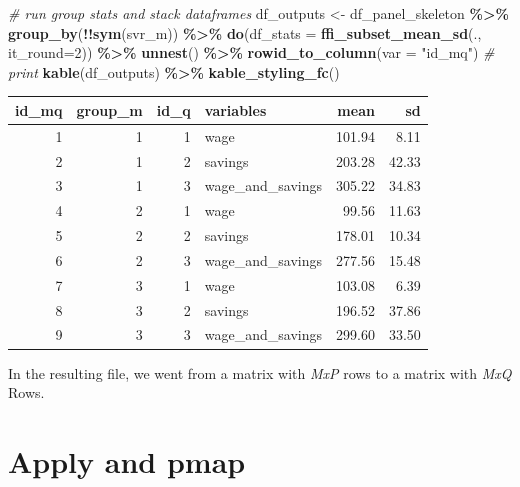 \documentclass[
]{book}
\newenvironment{Shaded}{\begin{snugshade}}{\end{snugshade}}
\newcommand{\CommentTok}[1]{\textcolor[rgb]{0.56,0.35,0.01}{\textit{#1}}}
\newcommand{\DataTypeTok}[1]{\textcolor[rgb]{0.13,0.29,0.53}{#1}}
\newcommand{\DecValTok}[1]{\textcolor[rgb]{0.00,0.00,0.81}{#1}}
\newcommand{\KeywordTok}[1]{\textcolor[rgb]{0.13,0.29,0.53}{\textbf{#1}}}
\newcommand{\NormalTok}[1]{#1}
\newcommand{\OperatorTok}[1]{\textcolor[rgb]{0.81,0.36,0.00}{\textbf{#1}}}
\newcommand{\StringTok}[1]{\textcolor[rgb]{0.31,0.60,0.02}{#1}}
\begin{document}
\begin{Shaded}
\begin{Highlighting}[]
\CommentTok{\# run group stats and stack dataframes}
\NormalTok{df\_outputs \textless{}{-}}\StringTok{ }\NormalTok{df\_panel\_skeleton }\OperatorTok{\%\textgreater{}\%}\StringTok{ }\KeywordTok{group\_by}\NormalTok{(}\OperatorTok{!!}\KeywordTok{sym}\NormalTok{(svr\_m)) }\OperatorTok{\%\textgreater{}\%}
\StringTok{  }\KeywordTok{do}\NormalTok{(}\DataTypeTok{df\_stats =} \KeywordTok{ffi\_subset\_mean\_sd}\NormalTok{(., }\DataTypeTok{it\_round=}\DecValTok{2}\NormalTok{)) }\OperatorTok{\%\textgreater{}\%}
\StringTok{  }\KeywordTok{unnest}\NormalTok{() }\OperatorTok{\%\textgreater{}\%}
\StringTok{  }\KeywordTok{rowid\_to\_column}\NormalTok{(}\DataTypeTok{var =} \StringTok{"id\_mq"}\NormalTok{)}
\CommentTok{\# print}
\KeywordTok{kable}\NormalTok{(df\_outputs) }\OperatorTok{\%\textgreater{}\%}\StringTok{ }\KeywordTok{kable\_styling\_fc}\NormalTok{()}
\end{Highlighting}
\end{Shaded}

\begin{table}[!h]
\centering
\begin{tabular}{r|r|r|l|r|r}
\hline
id\_mq & group\_m & id\_q & variables & mean & sd\\
\hline
\rowcolor{gray!6}  1 & 1 & 1 & wage & 101.94 & 8.11\\
\hline
2 & 1 & 2 & savings & 203.28 & 42.33\\
\hline
\rowcolor{gray!6}  3 & 1 & 3 & wage\_and\_savings & 305.22 & 34.83\\
\hline
4 & 2 & 1 & wage & 99.56 & 11.63\\
\hline
\rowcolor{gray!6}  5 & 2 & 2 & savings & 178.01 & 10.34\\
\hline
6 & 2 & 3 & wage\_and\_savings & 277.56 & 15.48\\
\hline
\rowcolor{gray!6}  7 & 3 & 1 & wage & 103.08 & 6.39\\
\hline
8 & 3 & 2 & savings & 196.52 & 37.86\\
\hline
\rowcolor{gray!6}  9 & 3 & 3 & wage\_and\_savings & 299.60 & 33.50\\
\hline
\end{tabular}
\end{table}

In the resulting file, we went from a matrix with \emph{MxP} rows to a matrix with \emph{MxQ} Rows.

\hypertarget{apply-and-pmap}{%
\section{Apply and pmap}\label{apply-and-pmap}}
\end{document}
